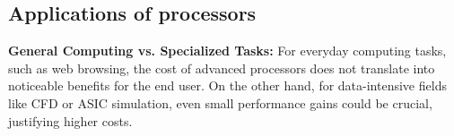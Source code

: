 \documentclass[11pt]{article}
\begin{document}
\subsection*{Applications of processors}
\textbf{General Computing vs. Specialized Tasks:} For everyday computing tasks, such as web browsing, the cost of advanced processors does not translate into noticeable benefits for the end user. On the other hand, for data-intensive fields like CFD or ASIC simulation, even small performance gains could be crucial, justifying higher costs.


	
\end{document}
